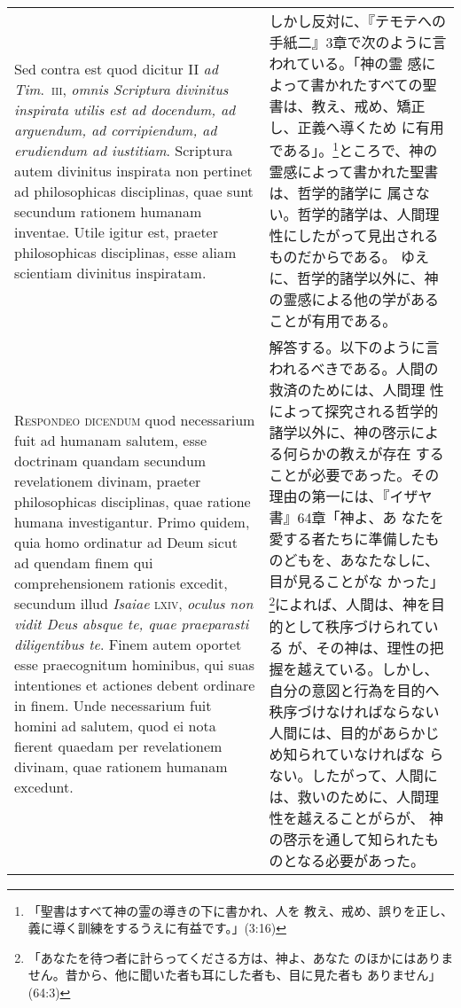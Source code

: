 \documentclass[10pt]{jsarticle}
\begin{document}
\begin{longtable}{p{21em}p{21em}}
\\



Sed contra est quod dicitur II {\itshape ad Tim}.~{\scshape iii},
{\itshape omnis Scriptura divinitus inspirata utilis est ad docendum, ad
arguendum, ad corripiendum, ad erudiendum ad iustitiam}. Scriptura autem
divinitus inspirata non pertinet ad philosophicas disciplinas, quae sunt
secundum rationem humanam inventae. Utile igitur est, praeter
philosophicas disciplinas, esse aliam scientiam divinitus inspiratam.

&

しかし反対に、『テモテへの手紙二』3章で次のように言われている。「神の霊
 感によって書かれたすべての聖書は、教え、戒め、矯正し、正義へ導くため
 に有用である」。\footnote{「聖書はすべて神の霊の導きの下に書かれ、人を
 教え、戒め、誤りを正し、義に導く訓練をするうえに有益です。」(3:16)}ところで、神の霊感によって書かれた聖書は、哲学的諸学に
 属さない。哲学的諸学は、人間理性にしたがって見出されるものだからである。
 ゆえに、哲学的諸学以外に、神の霊感による他の学があることが有用である。

\\



{\scshape Respondeo dicendum} quod necessarium fuit ad humanam
salutem, esse doctrinam quandam secundum revelationem divinam, praeter
philosophicas disciplinas, quae ratione humana investigantur. Primo
quidem, quia homo ordinatur ad Deum sicut ad quendam finem qui
comprehensionem rationis excedit, secundum illud {\itshape Isaiae}
{\scshape lxiv}, {\itshape oculus non vidit Deus absque te, quae
praeparasti diligentibus te}. Finem autem oportet esse praecognitum
hominibus, qui suas intentiones et actiones debent ordinare in
finem. Unde necessarium fuit homini ad salutem, quod ei nota fierent
quaedam per revelationem divinam, quae rationem humanam excedunt.

&

解答する。以下のように言われるべきである。人間の救済のためには、人間理
性によって探究される哲学的諸学以外に、神の啓示による何らかの教えが存在
することが必要であった。その理由の第一には、『イザヤ書』64章「神よ、あ
なたを愛する者たちに準備したものどもを、あなたなしに、目が見ることがな
かった」\footnote{「あなたを待つ者に計らってくださる方は、神よ、あなた
のほかにはありません。昔から、他に聞いた者も耳にした者も、目に見た者も
ありません」(64:3)}によれば、人間は、神を目的として秩序づけられている
が、その神は、理性の把握を越えている。しかし、自分の意図と行為を目的へ
秩序づけなければならない人間には、目的があらかじめ知られていなければな
らない。したがって、人間には、救いのために、人間理性を越えることがらが、
神の啓示を通して知られたものとなる必要があった。



\end{longtable}
\end{document}

